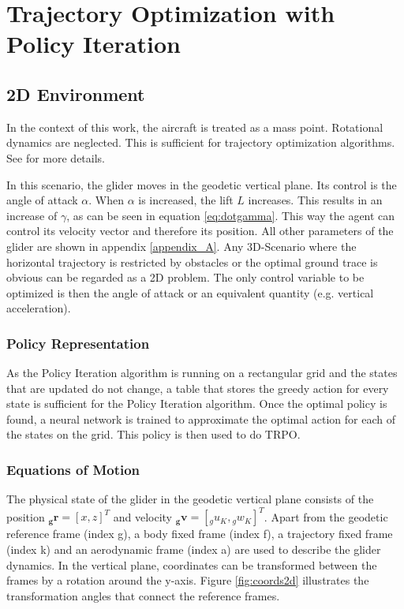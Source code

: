 \chapter{Trajectory Optimization with Policy Iteration}

\section{2D Environment}

In the context of this work, the aircraft is treated as a mass point. Rotational dynamics are neglected. This is sufficient for trajectory optimization algorithms. See \cite{Fichter2009} for more details. 


In this scenario, the glider moves in the geodetic vertical plane. Its control is the angle of attack $\alpha$. When $\alpha$ is increased, the lift $L$ increases. This results in an increase of $\gamma$, as can be seen in equation \ref{eq:dotgamma}. This way the agent can control its velocity vector and therefore its position. All other parameters of the glider are shown in appendix \ref{appendix_A}. Any 3D-Scenario where the horizontal trajectory is restricted by obstacles or the optimal ground trace is obvious can be regarded as a 2D problem. The only control variable to be optimized is then the angle of attack or an equivalent quantity (e.g. vertical acceleration).

\subsection{Policy Representation}

As the Policy Iteration algorithm is running on a rectangular grid and the states that are updated do not change, a table that stores the greedy action for every state is sufficient for the Policy Iteration algorithm. Once the optimal policy is found, a neural network is trained to approximate the optimal action for each of the states on the grid. This policy is then used to do TRPO.

\subsection{Equations of Motion}

The physical state of the glider in the geodetic vertical plane consists of the position $\boldsymbol{{}_g r}=[x,z]^T$ and velocity $\boldsymbol{{}_g v}=[{}_g u_K,{}_g w_K]^T$. Apart from the geodetic reference frame (index g), a body fixed frame (index f), a trajectory fixed frame (index k) and an aerodynamic frame (index a) are used to describe the glider dynamics. In the vertical plane, coordinates can be transformed between the frames by a rotation around the y-axis. Figure \ref{fig:coords2d} illustrates the transformation angles that connect the reference frames. 

